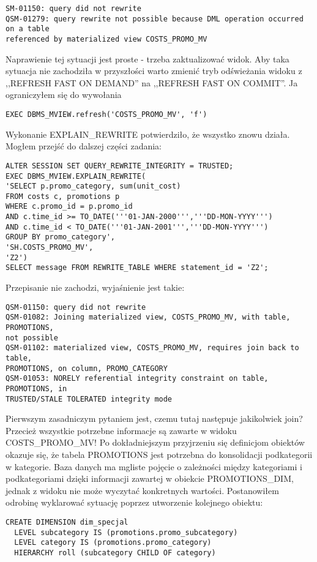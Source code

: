 \documentclass[a4paper,11pt]{article}
\begin{document}
\begin{verbatim}
SM-01150: query did not rewrite
QSM-01279: query rewrite not possible because DML operation occurred on a table 
referenced by materialized view COSTS_PROMO_MV
\end{verbatim}
Naprawienie tej sytuacji jest proste - trzeba zaktualizować widok. Aby taka sytuacja nie zachodziła w przyszłości warto zmienić tryb odświeżania widoku z ,,REFRESH FAST ON DEMAND'' na ,,REFRESH FAST ON COMMIT''. Ja ograniczyłem się do wywołania
\begin{verbatim}
EXEC DBMS_MVIEW.refresh('COSTS_PROMO_MV', 'f')
\end{verbatim}
Wykonanie EXPLAIN\_REWRITE potwierdziło, że wszystko znowu działa. Mogłem przejść do dalszej części zadania:
\begin{verbatim}
ALTER SESSION SET QUERY_REWRITE_INTEGRITY = TRUSTED;
EXEC DBMS_MVIEW.EXPLAIN_REWRITE(
'SELECT p.promo_category, sum(unit_cost)
FROM costs c, promotions p
WHERE c.promo_id = p.promo_id
AND c.time_id >= TO_DATE('''01-JAN-2000''','''DD-MON-YYYY''')
AND c.time_id < TO_DATE('''01-JAN-2001''','''DD-MON-YYYY''')
GROUP BY promo_category',
'SH.COSTS_PROMO_MV',
'Z2')
SELECT message FROM REWRITE_TABLE WHERE statement_id = 'Z2';
\end{verbatim}
Przepisanie nie zachodzi, wyjaśnienie jest takie:
\begin{verbatim}
QSM-01150: query did not rewrite                                                
QSM-01082: Joining materialized view, COSTS_PROMO_MV, with table, PROMOTIONS,
not possible
QSM-01102: materialized view, COSTS_PROMO_MV, requires join back to table, 
PROMOTIONS, on column, PROMO_CATEGORY
QSM-01053: NORELY referential integrity constraint on table, PROMOTIONS, in 
TRUSTED/STALE TOLERATED integrity mode
\end{verbatim}
Pierwszym zasadniczym pytaniem jest, czemu tutaj następuje jakikolwiek join? Przecież wszystkie potrzebne informacje
są zawarte w widoku COSTS\_PROMO\_MV! Po dokładniejszym przyjrzeniu się definicjom obiektów okazuje się, że tabela
PROMOTIONS jest potrzebna do konsolidacji podkategorii w kategorie. Baza danych ma mgliste pojęcie o zależności między kategoriami i podkategoriami dzięki informacji zawartej w obiekcie PROMOTIONS\_DIM, jednak z widoku nie może wyczytać konkretnych wartości. Postanowiłem odrobinę wyklarować sytuację poprzez utworzenie kolejnego obiektu:
\begin{verbatim}
CREATE DIMENSION dim_specjal
  LEVEL subcategory IS (promotions.promo_subcategory) 
  LEVEL category IS (promotions.promo_category) 
  HIERARCHY roll (subcategory CHILD OF category)
\end{verbatim}
\end{document}
